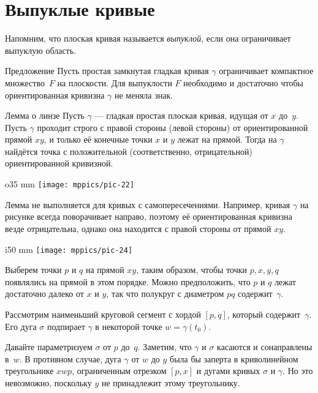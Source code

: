 \section{Выпуклые кривые}

Напомним, что плоская кривая называется \emph{выпуклой}, если она ограничивает выпуклую область.

\begin{thm}{Предложение}\label{prop:convex}
Пусть простая замкнутая гладкая кривая $\gamma$ ограничивает компактное множество~$F$ на плоскости.
Для выпуклости $F$ необходимо и достаточно чтобы ориентированная кривизна $\gamma$ не меняла знак.
\end{thm}


\begin{thm}{Лемма о линзе}\label{lem:lens}
Пусть $\gamma$ --- гладкая простая плоская кривая, идущая от $x$ до~$y$.
Пусть $\gamma$ проходит строго с правой стороны (левой стороны) от ориентированной прямой $xy$, и только её конечные точки $x$ и $y$ лежат на прямой.
Тогда на $\gamma$ найдётся точка с положительной (соответственно, отрицательной) ориентированной кривизной.
\end{thm}

{

\begin{wrapfigure}{o}{35 mm}
\vskip-0mm
\centering
\texttt{[image: mppics/pic-22]}
\vskip0mm
\end{wrapfigure}

Лемма не выполняется для кривых с самопересечениями.
Например, кривая $\gamma$ на рисунке всегда поворачивает направо, 
поэтому её ориентированная кривизна везде отрицательна, однако она находится с правой стороны от прямой $xy$.


}


\begin{wrapfigure}[6]{i}{50 mm}
\vskip-0mm
\centering
\texttt{[image: mppics/pic-24]}
\end{wrapfigure}

Выберем точки $p$ и $q$ на прямой $xy$, 
таким образом, чтобы точки $p, x, y, q$ появлялись на прямой в этом порядке.
Можно предположить, что $p$ и $q$ лежат достаточно далеко от $x$ и $y$, так что полукруг с диаметром $pq$ содержит~$\gamma$.

Рассмотрим наименьший круговой сегмент с хордой $[p,q]$, который содержит~$\gamma$.
Его дуга $\sigma$ подпирает $\gamma$ в некоторой точке $w=\gamma(t_0)$.

Давайте параметризуем $\sigma$ от $p$ до~$q$.
Заметим, что $\gamma$ и $\sigma$ касаются и сонаправлены в~$w$.
В противном случае, дуга $\gamma$ от $w$ до $y$ была бы заперта в криволинейном треугольнике $xwp$, ограниченным отрезком $[p,x]$ и дугами кривых $\sigma$ и $\gamma$.
Но это невозможно, поскольку $y$ не принадлежит этому треугольнику.

